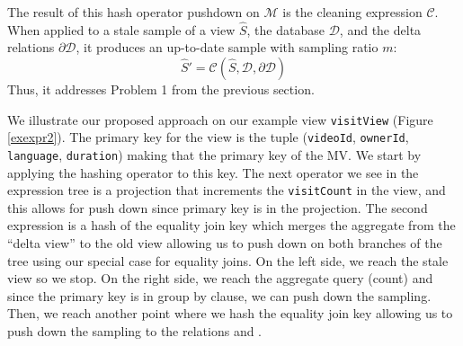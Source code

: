 


\vspace{0.25em}

The result of this hash operator pushdown on $\mathcal{M}$ is the cleaning expression $\mathcal{C}$. 
When applied to a stale sample of a view $\widehat{S}$, the database $\mathcal{D}$, and the delta relations $\partial \mathcal{D}$, it produces an up-to-date sample with sampling ratio $m$:
\[
\widehat{S}' = \mathcal{C}(\widehat{S},\mathcal{D},\partial \mathcal{D})
\]
Thus, it addresses Problem 1 from the previous section.

\begin{example}
We illustrate our proposed approach on our example view \texttt{visitView} (Figure \ref{exexpr2}). 
The primary key for the view is the tuple (\texttt{videoId}, \texttt{ownerId}, \texttt{language}, \texttt{duration}) making that the primary key of the MV.
We start by applying the hashing operator to this key.
The next operator we see in the expression tree is a projection that increments the \texttt{visitCount} in the view, and this allows
for push down since primary key is in the projection.
The second expression is a hash of the equality join key which merges the aggregate from the ``delta view'' to the old view allowing us to push down on both branches of the tree using our special case for equality joins.
On the left side, we reach the stale view so we stop.
On the right side, we reach the aggregate query (count) and since the primary key is in group by clause, we can push down the sampling.
Then, we reach another point where we hash the equality join key allowing us to push down the sampling to the relations  and .
\end{example}

